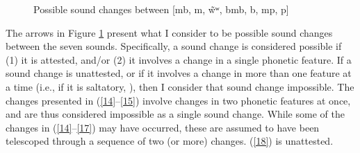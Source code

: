 \documentclass[output=paper,hidelinks]{langscibook}
\begin{document}
\begin{figure}
  \caption{Possible sound changes between [mb, m, \~wʷ, bmb, b, mp, p]\label{statemap}}
\end{figure}

The arrows in Figure \ref{statemap} present what I consider to be possible sound changes between the seven sounds. Specifically, a sound change is considered possible if (1) it is attested, and/or (2) it involves a change in a single phonetic feature. If a sound change is unattested, or if it involves a change in more than one feature at a time (i.e., if it is saltatory, \citealt{HayesWhite2015}), then I consider that sound change impossible. The changes presented in (\ref{14}--\ref{15}) involve changes in two phonetic features at once, and are thus considered impossible as a single sound change. While some of the changes in (\ref{14}--\ref{17}) may have occurred, these are assumed to have been telescoped through a sequence of two (or more) changes. (\ref{18}) is unattested.
\end{document}
